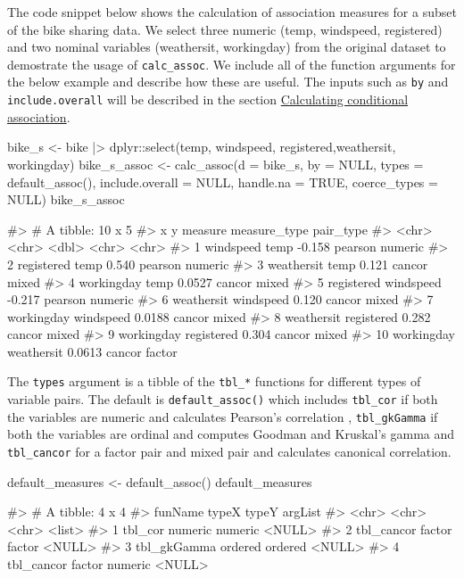 The code snippet below shows the calculation of association measures for
a subset of the bike sharing data. We select three numeric (temp,
windspeed, registered) and two nominal variables (weathersit,
workingday) from the original dataset to demostrate the usage of
\texttt{calc\_assoc}. We include all of the function arguments for the
below example and describe how these are useful. The inputs such as
\texttt{by} and \texttt{include.overall} will be described in the
section
\protect\hyperlink{calculating-conditional-association}{Calculating
conditional association}.

\begin{Schunk}
\begin{Sinput}
bike_s <- bike |> 
  dplyr::select(temp, windspeed, registered,weathersit, workingday)
bike_s_assoc <- calc_assoc(d = bike_s,
                           by = NULL,
                           types = default_assoc(),
                           include.overall = NULL,
                           handle.na = TRUE,
                           coerce_types = NULL)
bike_s_assoc
\end{Sinput}
\begin{Soutput}
#> # A tibble: 10 x 5
#>    x          y          measure measure_type pair_type
#>    <chr>      <chr>        <dbl> <chr>        <chr>    
#>  1 windspeed  temp       -0.158  pearson      numeric  
#>  2 registered temp        0.540  pearson      numeric  
#>  3 weathersit temp        0.121  cancor       mixed    
#>  4 workingday temp        0.0527 cancor       mixed    
#>  5 registered windspeed  -0.217  pearson      numeric  
#>  6 weathersit windspeed   0.120  cancor       mixed    
#>  7 workingday windspeed   0.0188 cancor       mixed    
#>  8 weathersit registered  0.282  cancor       mixed    
#>  9 workingday registered  0.304  cancor       mixed    
#> 10 workingday weathersit  0.0613 cancor       factor
\end{Soutput}
\end{Schunk}

The \texttt{types} argument is a tibble of the \texttt{tbl\_*} functions
for different types of variable pairs. The default is
\texttt{default\_assoc()} which includes \texttt{tbl\_cor} if both the
variables are numeric and calculates Pearson's correlation ,
\texttt{tbl\_gkGamma} if both the variables are ordinal and computes
Goodman and Kruskal's gamma and \texttt{tbl\_cancor} for a factor pair
and mixed pair and calculates canonical correlation.

\begin{Schunk}
\begin{Sinput}
default_measures <- default_assoc()
default_measures
\end{Sinput}
\begin{Soutput}
#> # A tibble: 4 x 4
#>   funName     typeX   typeY   argList
#>   <chr>       <chr>   <chr>   <list> 
#> 1 tbl_cor     numeric numeric <NULL> 
#> 2 tbl_cancor  factor  factor  <NULL> 
#> 3 tbl_gkGamma ordered ordered <NULL> 
#> 4 tbl_cancor  factor  numeric <NULL>
\end{Soutput}
\end{Schunk}


